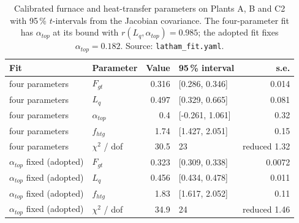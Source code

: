 \begin{table}[htbp]
\centering
\caption{Calibrated furnace and heat-transfer parameters on Plants A, B and C2 with 95\,\% $t$-intervals from the Jacobian covariance. The four-parameter fit has $\alpha_{top}$ at its bound with $r(L_q,\alpha_{top})=0.985$; the adopted fit fixes $\alpha_{top}=0.182$. Source: \texttt{latham\_fit.yaml}.}
\label{tab:cal}
\small
\begin{tabular}{llrlr}
\toprule
Fit & Parameter & Value & 95\,\% interval & s.e. \\
\midrule
four parameters & ${F_{gt}}$ & 0.316 & [0.286, 0.346] & 0.014 \\
four parameters & ${L_q}$ & 0.497 & [0.329, 0.665] & 0.081 \\
four parameters & ${\alpha_{top}}$ & 0.4 & [-0.261, 1.061] & 0.32 \\
four parameters & ${f_{htg}}$ & 1.74 & [1.427, 2.051] & 0.15 \\
four parameters & $\chi^2$ / dof & 30.5 & 23 & reduced 1.32 \\
$\alpha_{top}$ fixed (adopted) & ${F_{gt}}$ & 0.323 & [0.309, 0.338] & 0.0072 \\
$\alpha_{top}$ fixed (adopted) & ${L_q}$ & 0.456 & [0.434, 0.478] & 0.011 \\
$\alpha_{top}$ fixed (adopted) & ${f_{htg}}$ & 1.83 & [1.617, 2.052] & 0.11 \\
$\alpha_{top}$ fixed (adopted) & $\chi^2$ / dof & 34.9 & 24 & reduced 1.46 \\
\bottomrule
\end{tabular}
\end{table}
